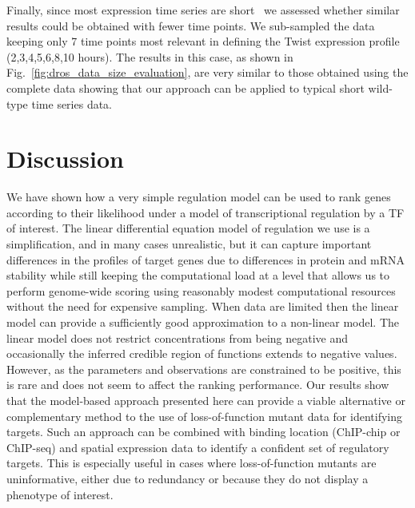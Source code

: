 \documentclass{pnastwo}
\begin{document}
\begin{article}
Finally, since most expression time series are short~\cite{Ernst2005}
we assessed whether similar results could be obtained with fewer time
points. We sub-sampled the data keeping only 7 time points most
relevant in defining the Twist expression profile
(2,3,4,5,6,8,10 hours). The results in this case, as shown in
Fig.~\ref{fig:dros_data_size_evaluation}, are very similar to 
those obtained using the complete data showing that 
our approach
can be applied to typical short wild-type time
series data.

\section{Discussion}

We have shown how a very simple regulation model can be used to rank
genes according to their likelihood under a model of transcriptional
regulation by a TF of interest. The linear differential equation model of regulation we use
is a simplification, and in many cases unrealistic, but it can capture important differences in
the profiles of target genes due to differences in protein and mRNA
stability while still keeping the computational load at a level
that allows us to perform genome-wide scoring using reasonably modest
computational resources without the need for expensive sampling.
When data are limited then the linear model can provide a sufficiently good
approximation to a non-linear model. 
The linear model does not restrict concentrations from being negative
and occasionally the inferred credible region of functions extends to negative
values. However, as the parameters and observations are constrained to be positive,
this is rare and does not seem to affect the ranking performance. Our
results show that the model-based approach presented here can provide
a viable alternative or complementary method to the use of
loss-of-function mutant data for identifying targets. Such an approach
can be combined with binding location (ChIP-chip or ChIP-seq)
and spatial expression data to identify a confident set of regulatory
targets. This is especially useful in cases where loss-of-function
mutants are uninformative, either due to redundancy or because they do
not display a phenotype of interest. 


\end{article}
\end{document}
